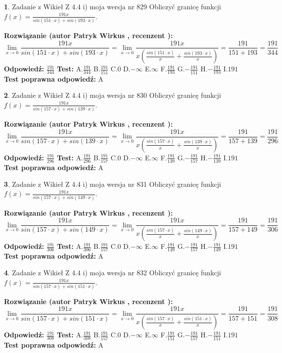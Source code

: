 \documentclass[12pt, a4paper]{article}
\theoremstyle{definition} %
\newtheorem{zad}{}
\newcommand{\zadStart}[1]{\begin{zad}#1\newline}
\newcommand{\zadStop}{\end{zad}}
\newcommand{\rozwStart}[2]{\noindent \textbf{Rozwiązanie (autor #1 , recenzent #2): }\newline}
\newcommand{\rozwStop}{\newline}
\newcommand{\odpStart}{\noindent \textbf{Odpowiedź:}\newline}
\newcommand{\odpStop}{\newline}
\newcommand{\testStart}{\noindent \textbf{Test:}\newline}
\newcommand{\testStop}{\newline}
\newcommand{\kluczStart}{\noindent \textbf{Test poprawna odpowiedź:}\newline}
\newcommand{\kluczStop}{\newline}
\begin{document}
\zadStart{Zadanie z Wikieł Z 4.4 i) moja wersja nr 829}
Obliczyć granicę funkcji $f(x)=\frac{191x}{sin(151\cdot x) +sin(193\cdot x)}$.
\zadStop
\rozwStart{Patryk Wirkus}{}
$$\lim\limits_{x\to 0}\frac{191x}{sin(151\cdot x) +sin(193\cdot x)}=\lim\limits_{x\to 0}\frac{191x}{x(\frac{sin(151\cdot x)}{x}+\frac{sin(193\cdot x)}{x})}=\frac{191}{151+193} = \frac{191}{344}$$
\rozwStop
\odpStart
$\frac{191}{344}$
\odpStop
\testStart
A.$\frac{191}{344}$
B.$\frac{191}{151}$
C.$0$
D.$-\infty$
E.$\infty$
F.$\frac{191}{193}$
G.$-\frac{191}{151}$
H.$-\frac{191}{193}$
I.$191$
\testStop
\kluczStart
A
\kluczStop



\zadStart{Zadanie z Wikieł Z 4.4 i) moja wersja nr 830}
Obliczyć granicę funkcji $f(x)=\frac{191x}{sin(157\cdot x) +sin(139\cdot x)}$.
\zadStop
\rozwStart{Patryk Wirkus}{}
$$\lim\limits_{x\to 0}\frac{191x}{sin(157\cdot x) +sin(139\cdot x)}=\lim\limits_{x\to 0}\frac{191x}{x(\frac{sin(157\cdot x)}{x}+\frac{sin(139\cdot x)}{x})}=\frac{191}{157+139} = \frac{191}{296}$$
\rozwStop
\odpStart
$\frac{191}{296}$
\odpStop
\testStart
A.$\frac{191}{296}$
B.$\frac{191}{157}$
C.$0$
D.$-\infty$
E.$\infty$
F.$\frac{191}{139}$
G.$-\frac{191}{157}$
H.$-\frac{191}{139}$
I.$191$
\testStop
\kluczStart
A
\kluczStop



\zadStart{Zadanie z Wikieł Z 4.4 i) moja wersja nr 831}
Obliczyć granicę funkcji $f(x)=\frac{191x}{sin(157\cdot x) +sin(149\cdot x)}$.
\zadStop
\rozwStart{Patryk Wirkus}{}
$$\lim\limits_{x\to 0}\frac{191x}{sin(157\cdot x) +sin(149\cdot x)}=\lim\limits_{x\to 0}\frac{191x}{x(\frac{sin(157\cdot x)}{x}+\frac{sin(149\cdot x)}{x})}=\frac{191}{157+149} = \frac{191}{306}$$
\rozwStop
\odpStart
$\frac{191}{306}$
\odpStop
\testStart
A.$\frac{191}{306}$
B.$\frac{191}{157}$
C.$0$
D.$-\infty$
E.$\infty$
F.$\frac{191}{149}$
G.$-\frac{191}{157}$
H.$-\frac{191}{149}$
I.$191$
\testStop
\kluczStart
A
\kluczStop



\zadStart{Zadanie z Wikieł Z 4.4 i) moja wersja nr 832}
Obliczyć granicę funkcji $f(x)=\frac{191x}{sin(157\cdot x) +sin(151\cdot x)}$.
\zadStop
\rozwStart{Patryk Wirkus}{}
$$\lim\limits_{x\to 0}\frac{191x}{sin(157\cdot x) +sin(151\cdot x)}=\lim\limits_{x\to 0}\frac{191x}{x(\frac{sin(157\cdot x)}{x}+\frac{sin(151\cdot x)}{x})}=\frac{191}{157+151} = \frac{191}{308}$$
\rozwStop
\odpStart
$\frac{191}{308}$
\odpStop
\testStart
A.$\frac{191}{308}$
B.$\frac{191}{157}$
C.$0$
D.$-\infty$
E.$\infty$
F.$\frac{191}{151}$
G.$-\frac{191}{157}$
H.$-\frac{191}{151}$
I.$191$
\testStop
\kluczStart
A
\kluczStop
\end{document}
